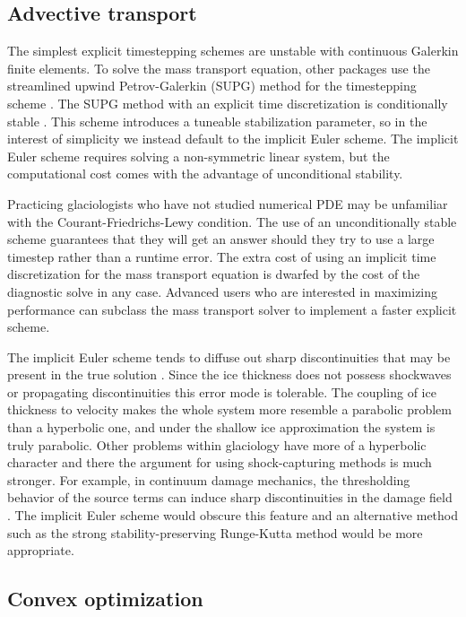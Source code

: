\documentclass{article}
\theoremstyle{definition}
\theoremstyle{plain}
\begin{document}
\subsection{Advective transport} \label{sec:prognostic-model}

The simplest explicit timestepping schemes are unstable with continuous Galerkin finite elements.
To solve the mass transport equation, other packages use the streamlined upwind Petrov-Galerkin (SUPG) method for the timestepping scheme \citep{brinkerhoff2013data, larour2012continental}.
The SUPG method with an explicit time discretization is conditionally stable \citep{donea2003finite}.
This scheme introduces a tuneable stabilization parameter, so in the interest of simplicity we instead default to the implicit Euler scheme.
The implicit Euler scheme requires solving a non-symmetric linear system, but the computational cost comes with the advantage of unconditional stability.

Practicing glaciologists who have not studied numerical PDE may be unfamiliar with the Courant-Friedrichs-Lewy condition.
The use of an unconditionally stable scheme guarantees that they will get an answer should they try to use a large timestep rather than a runtime error.
The extra cost of using an implicit time discretization for the mass transport equation is dwarfed by the cost of the diagnostic solve in any case.
Advanced users who are interested in maximizing performance can subclass the mass transport solver to implement a faster explicit scheme.

The implicit Euler scheme tends to diffuse out sharp discontinuities that may be present in the true solution \citep{donea2003finite}.
Since the ice thickness does not possess shockwaves or propagating discontinuities this error mode is tolerable.
The coupling of ice thickness to velocity makes the whole system more resemble a parabolic problem than a hyperbolic one, and under the shallow ice approximation the system is truly parabolic.
Other problems within glaciology have more of a hyperbolic character and there the argument for using shock-capturing methods is much stronger.
For example, in continuum damage mechanics, the thresholding behavior of the source terms can induce sharp discontinuities in the damage field \citep{albrecht2014fracture}.
The implicit Euler scheme would obscure this feature and an alternative method such as the strong stability-preserving Runge-Kutta method would be more appropriate.


\subsection{Convex optimization}
\end{document}
